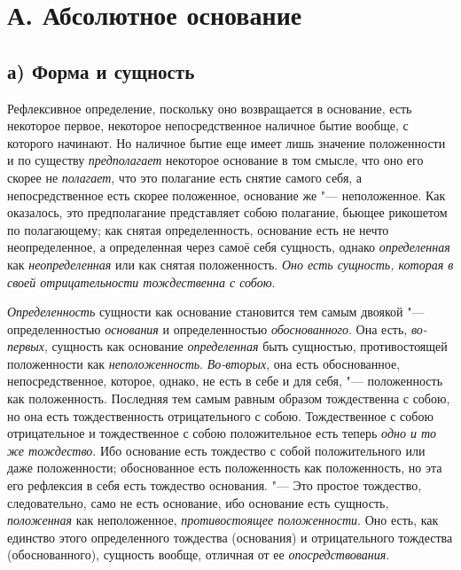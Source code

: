 \section[А. Абсолютное основание]{А. Абсолютное основание}
\subsection[а) Форма и сущность]{а) Форма и сущность}

Рефлексивное определение, поскольку оно
возвращается в основание, есть некоторое первое, некоторое непосредственное
наличное бытие вообще, с которого начинают. Но наличное бытие еще имеет
лишь значение положенности и по существу
{\em предполагает} некоторое основание в том смысле,
что оно его скорее не {\em полагает}, что это полагание
есть снятие самого себя, а непосредственное есть скорее положенное,
основание же "--- неположенное. Как оказалось, это предполагание представляет
собою полагание, бьющее рикошетом по полагающему; как снятая
определенность, основание есть не нечто неопределенное, а определенная
через самоё себя сущность, однако {\em определенная}
как {\em неопределенная} или как снятая положенность.
{\em Оно есть сущность, которая в своей отрицательности
тождественна с собою}.

{\em Определенность} сущности как основание становится
тем самым двоякой "--- определенностью {\em основания} и
определенностью {\em обоснованного}. Она есть,
{\em во-первых}, сущность как основание
{\em определенная} быть сущностью, противостоящей
положенности как {\em неположенность}.
{\em Во-вторых}, она есть обоснованное,
непосредственное, которое, однако, не есть в себе и для себя, "---
положенность как положенность. Последняя тем самым равным образом
тождественна с собою, но она есть тождественность отрицательного с собою.
Тождественное с собою отрицательное и тождественное с собою положительное
есть теперь {\em одно и то же тождество}. Ибо основание
есть тождество с собой положительного или даже положенности; обоснованное
есть положенность как положенность, но эта его рефлексия в себя есть
тождество основания. "--- Это простое тождество, следовательно, само не есть
основание, ибо основание есть сущность,
{\em положенная} как неположенное,
{\em противостоящее положенности}. Оно есть, как
единство этого определенного тождества (основания) и отрицательного
тождества (обоснованного), сущность вообще, отличная от ее
{\em опосредствования}.

